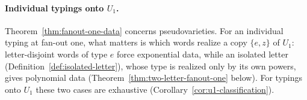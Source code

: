 
\paragraph{Individual typings onto $U_1$.}
Theorem~\ref{thm:fanout-one-data} concerns pseudovarieties.  For an
individual typing at fan-out one, what matters is which words realize a copy
$\{e,z\}$ of $U_1$: letter-disjoint words of type $e$ force exponential data,
while an isolated letter (Definition~\ref{def:isolated-letter}), whose type is
realized only by its own powers, gives polynomial data
(Theorem~\ref{thm:two-letter-fanout-one} below).  For typings onto $U_1$
these two cases are exhaustive (Corollary~\ref{cor:u1-classification}).

